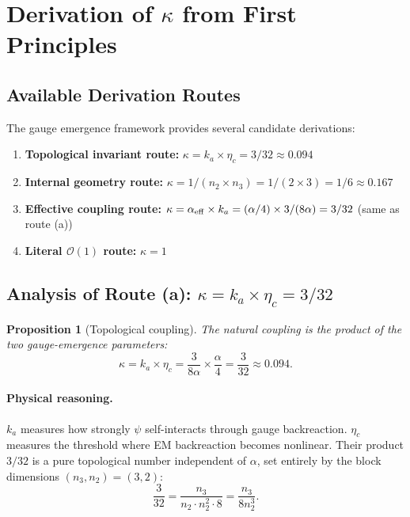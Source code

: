 \documentclass[12pt,a4paper]{article}
\newtheorem{proposition}{Proposition}
\begin{document}
\section{Derivation of $\kappa$ from First Principles}
\label{sec:derivation}

\subsection{Available Derivation Routes}

The gauge emergence framework provides several candidate derivations:

\begin{enumerate}
\item[(a)] \textbf{Topological invariant route:}
$\kappa = k_a \times \eta_c = 3/32 \approx 0.094$

\item[(b)] \textbf{Internal geometry route:}
$\kappa = 1/(n_2 \times n_3) = 1/(2 \times 3) = 1/6 \approx 0.167$

\item[(c)] \textbf{Effective coupling route:}
$\kappa = \alpha_{\rm eff} \times k_a = (\alpha/4) \times 3/(8\alpha) = 3/32$
(same as route (a))

\item[(d)] \textbf{Literal $\mathcal{O}(1)$ route:}
$\kappa = 1$
\end{enumerate}

\subsection{Analysis of Route (a): $\kappa = k_a \times \eta_c = 3/32$}

\begin{proposition}[Topological coupling]
The natural coupling is the product of the two gauge-emergence parameters:
\begin{equation}
\kappa = k_a \times \eta_c = \frac{3}{8\alpha} \times \frac{\alpha}{4} = \frac{3}{32} \approx 0.094.
\end{equation}
\end{proposition}

\paragraph{Physical reasoning.}
$k_a$ measures how strongly $\psi$ self-interacts through gauge backreaction.
$\eta_c$ measures the threshold where EM backreaction becomes nonlinear.
Their product $3/32$ is a pure topological number independent of $\alpha$,
set entirely by the block dimensions $(n_3, n_2) = (3, 2)$:
\[
\frac{3}{32} = \frac{n_3}{n_2 \cdot n_2^2 \cdot 8}
= \frac{n_3}{8 n_2^3}.
\]
\end{document}
